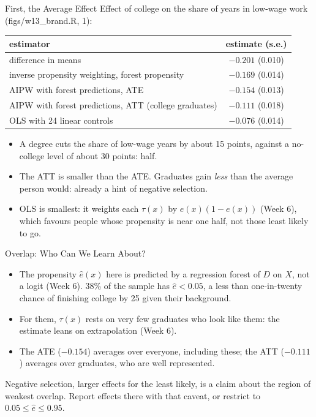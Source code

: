 \documentclass[aspectratio=169,11pt,xcolor=dvipsnames]{beamer}
\newcommand{\srcp}[1]{{\scriptsize\color{gray}(#1)}}
\begin{document}
\begin{frame}{First, the Average Effect}
Effect of college on the share of years in low-wage work \srcp{figs/w13\_brand.R, 1}:
\begin{center}\small
\renewcommand{\arraystretch}{1.12}
\begin{tabular}{@{}lc@{}}
\toprule
estimator & estimate (s.e.) \\
\midrule
difference in means & $-0.201$ (0.010) \\
inverse propensity weighting, forest propensity & $-0.169$ (0.014) \\
AIPW with forest predictions, ATE & $-0.154$ (0.013) \\
AIPW with forest predictions, ATT (college graduates) & $-0.111$ (0.018) \\
OLS with 24 linear controls & $-0.076$ (0.014) \\
\bottomrule
\end{tabular}
\end{center}
\vskip2pt
\begin{itemize}\itemsep3pt\small
  \item A degree cuts the share of low-wage years by about 15 points, against a no-college
        level of about 30 points: half.
  \item The ATT is smaller than the ATE. Graduates gain \emph{less} than the average person
        would: already a hint of negative selection.
  \item OLS is smallest: it weights each $\tau(x)$ by $e(x)(1-e(x))$ (Week 6), which favours
        people whose propensity is near one half, not those least likely to go.
\end{itemize}
\end{frame}

\begin{frame}{Overlap: Who Can We Learn About?}
\begin{itemize}\itemsep4pt
  \item The propensity $\hat e(x)$ here is predicted by a regression forest of $D$ on $X$, not a logit
        (Week 6). 38\% of the sample has $\hat e < 0.05$, a less than one-in-twenty chance of finishing
        college by 25 given their background.
  \item For them, $\tau(x)$ rests on very few graduates who look like them: the estimate
        leans on extrapolation (Week 6).
  \item The ATE ($-0.154$) averages over everyone, including these; the ATT ($-0.111$)
        averages over graduates, who are well represented.
\end{itemize}
\vskip4pt
{\small Negative selection, larger effects for the least likely, is a claim about the region of
weakest overlap. Report effects there with that caveat, or restrict to
$0.05 \leq \hat e \leq 0.95$.}
\end{frame}
\end{document}
